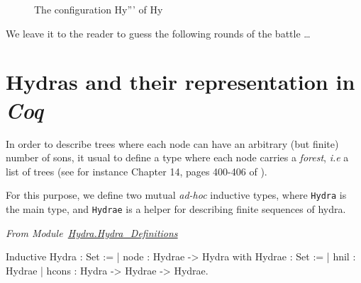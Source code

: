\documentclass[a4paper]{book}
\begin{document}
\begin{figure}[hp]
\caption{The configuration Hy''' of Hy \label{fig:Hy5}}
\end{figure}
\FloatBarrier

We leave it to the reader  to guess the following  rounds of the battle \dots



\section{Hydras and their representation in \emph{Coq}}
\label{sec:orgheadline48}


In order to describe trees where each node can have an arbitrary (but finite) number of sons, it usual to define a type where each node carries a \emph{forest}, \emph{i.e} a list of trees
(see for instance Chapter 14, pages 400-406 of \cite{BC04}).

For this purpose, we define two mutual \emph{ad-hoc}  inductive types, where \texttt{Hydra} is the main type, and \texttt{Hydrae} is a helper for describing finite sequences of hydra.
\label{types:Hydra}
\label{types:Hydrae}

\vspace{4pt}
\emph{From Module~\href{../src/html/hydras.Hydra.Hydra_Definitions.html\#Hydra}{Hydra.Hydra\_Definitions}}

\begin{Coqsrc}
Inductive Hydra : Set :=
| node :  Hydrae -> Hydra
with Hydrae : Set :=
| hnil : Hydrae
| hcons : Hydra -> Hydrae -> Hydrae.
\end{Coqsrc}
\end{document}
